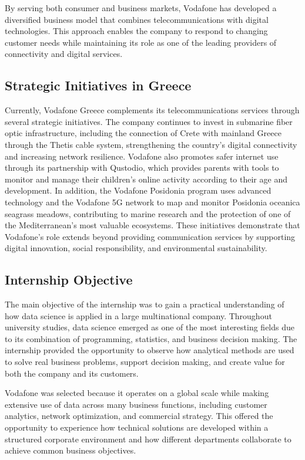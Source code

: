 \documentclass[12pt, a4paper, oneside]{report}
\begin{document}
By serving both consumer and business markets, Vodafone has developed a diversified business model that combines telecommunications with digital technologies. This approach enables the company to respond to changing customer needs while maintaining its role as one of the leading providers of connectivity and digital services.

\subsection{ Strategic Initiatives in Greece}
Currently, Vodafone Greece complements its telecommunications services through several strategic initiatives. The company continues to invest in submarine fiber optic infrastructure, including the connection of Crete with mainland Greece through the Thetis cable system, strengthening the country's digital connectivity and increasing network resilience. Vodafone also promotes safer internet use through its partnership with Qustodio, which provides parents with tools to monitor and manage their children's online activity according to their age and development. In addition, the Vodafone Posidonia program uses advanced technology and the Vodafone 5G network to map and monitor Posidonia oceanica seagrass meadows, contributing to marine research and the protection of one of the Mediterranean's most valuable ecosystems. These initiatives demonstrate that Vodafone's role extends beyond providing communication services by supporting digital innovation, social responsibility, and environmental sustainability.

\subsection{Internship Objective}
The main objective of the internship was to gain a practical understanding of how data science is applied in a large multinational company. Throughout university studies, data science emerged as one of the most interesting fields due to its combination of programming, statistics, and business decision making. The internship provided the opportunity to observe how analytical methods are used to solve real business problems, support decision making, and create value for both the company and its customers.

Vodafone was selected because it operates on a global scale while making extensive use of data across many business functions, including customer analytics, network optimization, and commercial strategy. This offered the opportunity to experience how technical solutions are developed within a structured corporate environment and how different departments collaborate to achieve common business objectives.
\end{document}
